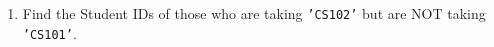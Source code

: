 \documentclass[12pt,a4paper]{article}
\begin{document}
\begin{enumerate}


\item Find the Student IDs of those who are taking \texttt{'CS102'} but are NOT taking \texttt{'CS101'}.






\end{enumerate}
\end{document}
